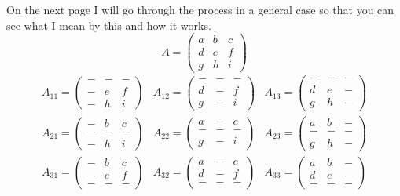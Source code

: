 \documentclass{article}
\begin{document}
On the next page I will go through the process in a general case so that you can see what I mean by this and how it works. 
\newpage
\[
	A = 
	\begin{pmatrix}
		a & b & c\\
		d & e & f\\
		g & h & i
	\end{pmatrix}
\]
\[
	\begin{matrix}
				A_{11} = 
				\begin{pmatrix}
					- & - & -\\
					- & e & f\\
					- & h & i
				\end{pmatrix}
			&
				A_{12} = 
				\begin{pmatrix}
					- & - & -\\
					d & - & f\\
					g & - & i
				\end{pmatrix}
			&
				A_{13} = 
				\begin{pmatrix}
					- & - & -\\
					d & e & -\\
					g & h & -
				\end{pmatrix}
		\\
				A_{21} = 
				\begin{pmatrix}
					- & b & c\\
					- & - & -\\
					- & h & i
				\end{pmatrix}
			&
				A_{22} = 
				\begin{pmatrix}
					a & - & c\\
					- & - & -\\
					g & - & i
				\end{pmatrix}
			&
				A_{23} = 
				\begin{pmatrix}
					a & b & -\\
					- & - & -\\
					g & h & -
				\end{pmatrix}
		\\
				A_{31} = 
				\begin{pmatrix}
					- & b & c\\
					- & e & f\\
					- & - & -
				\end{pmatrix}
			&
				A_{32} = 
				\begin{pmatrix}
					a & - & c\\
					d & - & f\\
					- & - & -
				\end{pmatrix}
			&
				A_{33} = 
				\begin{pmatrix}
					a & b & -\\
					d & e & -\\
					- & - & -
				\end{pmatrix}
	\end{matrix}
\]
\end{document}
